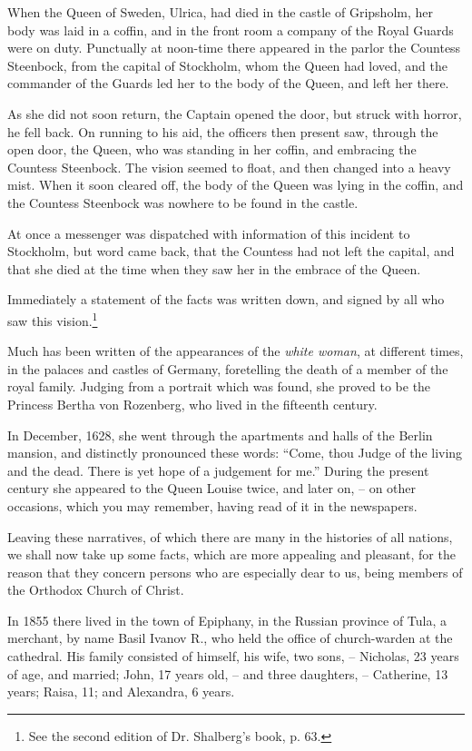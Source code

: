 When the Queen of Sweden, Ulrica, had died in the castle of Gripsholm, her body was laid in a coffin, and in the front room a company of the Royal Guards were on duty. Punctually at noon-time there appeared in the parlor the Countess Steenbock, from the capital of Stockholm, whom the Queen had loved, and the commander of the Guards led her to the body of the Queen, and left her there.

As she did not soon return, the Captain opened the door, but struck with horror, he fell back. On running to his aid, the officers then present saw, through the open door, the Queen, who was standing in her coffin, and embracing the Countess Steenbock. The vision seemed to float, and then changed into a heavy mist. When it soon cleared off, the body of the Queen was lying in the coffin, and the Countess Steenbock was nowhere to be found in the castle.

At once a messenger was dispatched with information of this incident to Stockholm, but word came back, that the Countess had not left the capital, and that she died at the time when they saw her in the embrace of the Queen.

Immediately a statement of the facts was written down, and signed by all who saw this vision.\footnote{See the second edition of Dr. Shalberg's book, p. 63.}

Much has been written of the appearances of the \textit{white woman}, at different times, in the palaces and castles of Germany, foretelling the death of a member of the royal family. Judging from a portrait which was found, she proved to be the Princess Bertha von Rozenberg, who lived in the fifteenth century.

In December, 1628, she went through the apartments and halls of the Berlin mansion, and distinctly pronounced these words: ``Come, thou Judge of the living and the dead. There is yet hope of a judgement for me.'' During the present century she appeared to the Queen Louise twice, and later on, -- on other occasions, which you may remember, having read of it in the newspapers.

Leaving these narratives, of which there are many in the histories of all nations, we shall now take up some facts, which are more appealing and pleasant, for the reason that they concern persons who are especially dear to us, being members of the Orthodox Church of Christ.

In 1855 there lived in the town of Epiphany, in the Russian province of Tula, a merchant, by name Basil Ivanov R., who held the office of church-warden at the cathedral. His family consisted of himself, his wife, two sons, -- Nicholas, 23 years of age, and married; John, 17 years old, -- and three daughters, -- Catherine, 13 years; Raisa, 11; and Alexandra, 6 years.

